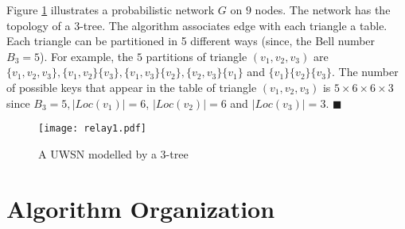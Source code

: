 \begin{example}
\normalfont
Figure \ref{fig:3t} illustrates a probabilistic network $G$ on $9$ nodes. The network has the topology of a $3$-tree. The algorithm associates edge with each triangle a table. Each triangle can be partitioned in 5 different ways (since, the Bell number $B_3=5$). For example, the $5$ partitions of triangle $(v_1,v_2,v_3)$  are $\{v_1,v_2,v_3\}, \{v_1,v_2\}\{v_3\}, \{v_1,v_3\}\{v_2\},\{v_2,v_3\}\{v_1\}$ and $\{v_1\}\{v_2\}\{v_3\} $. The number of possible keys that appear in the table of triangle $(v_1,v_2,v_3)$ is $5 \times 6 \times 6 \times 3$ since $B_3=5, |Loc(v_1)|=6$, $|Loc(v_2)|=6$ and $|Loc(v_3)|=3$. $\blacksquare$
\end{example}
\begin{figure}[htbp]
\centering
\texttt{[image: relay1.pdf]}
 \caption{ A UWSN modelled by a $3$-tree}
 \label{fig:3t}
\end{figure}

\section{Algorithm Organization}
\label{sec:algorg}

